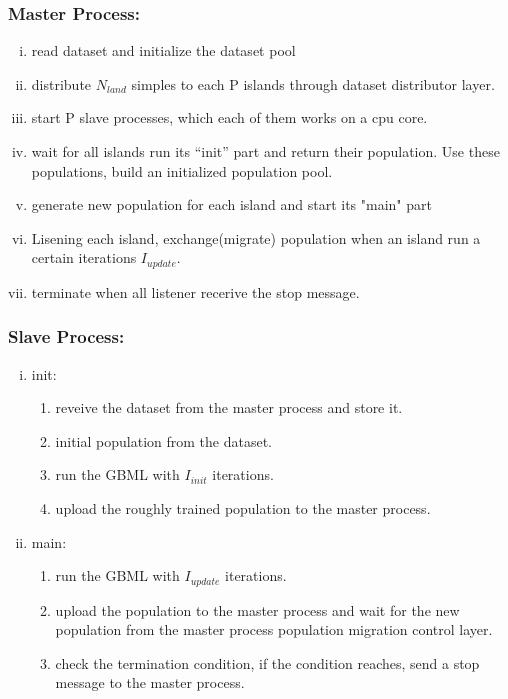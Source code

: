 \documentclass[conference]{IEEEtran}
\begin{document}
		\subsubsection{Master Process:}	
		\begin{enumerate}[(i)]
			\item read dataset and initialize the dataset pool 
			\item distribute $N_{land}$ simples to each P islands through dataset distributor layer.
			\item start P slave processes, which each of them works on a cpu core.
			\item wait for all islands run its “init” part and return their population. Use these populations, build an initialized population pool.
			\item generate new population for each island and start its "main" part
			\item Lisening each island, exchange(migrate) population when an island run a certain iterations $I_{update}$.
			\item terminate when all listener recerive the stop message.
		\end{enumerate}

		\subsubsection{Slave Process:}
			\begin{enumerate}[(i)]
				\item init:
				\begin{enumerate}[(1)]
					\item reveive the dataset from the master process and store it.
					\item initial population from the dataset.
					\item run the GBML with $I_{init}$ iterations.
					\item upload the roughly trained population to the master process.
				\end{enumerate}
				\item main:	
				\begin{enumerate}[(1)]
					\item run the GBML with $I_{update}$ iterations.
					\item upload the population to the master process and wait for the new population from the master process population migration control layer.
					\item check the termination condition, if the condition reaches, send a stop message to the master process.
									
				\end{enumerate}
			\end{enumerate}
\end{document}
